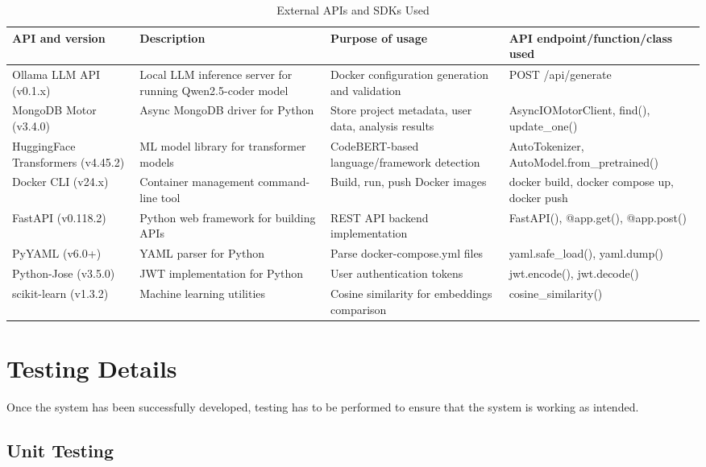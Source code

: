 \begin{table}[H]
\centering
\caption{External APIs and SDKs Used}
\label{tab:apis}
\begin{tabular}{|p{3.5cm}|p{4cm}|p{4cm}|p{4cm}|}
\hline
\textbf{API and version} & \textbf{Description} & \textbf{Purpose of usage} & \textbf{API endpoint/function/class used} \\
\hline
Ollama LLM API (v0.1.x) & Local LLM inference server for running Qwen2.5-coder model & Docker configuration generation and validation & POST /api/generate \\
\hline
MongoDB Motor (v3.4.0) & Async MongoDB driver for Python & Store project metadata, user data, analysis results & AsyncIOMotorClient, find(), update\_one() \\
\hline
HuggingFace Transformers (v4.45.2) & ML model library for transformer models & CodeBERT-based language/framework detection & AutoTokenizer, AutoModel.from\_pretrained() \\
\hline
Docker CLI (v24.x) & Container management command-line tool & Build, run, push Docker images & docker build, docker compose up, docker push \\
\hline
FastAPI (v0.118.2) & Python web framework for building APIs & REST API backend implementation & FastAPI(), @app.get(), @app.post() \\
\hline
PyYAML (v6.0+) & YAML parser for Python & Parse docker-compose.yml files & yaml.safe\_load(), yaml.dump() \\
\hline
Python-Jose (v3.5.0) & JWT implementation for Python & User authentication tokens & jwt.encode(), jwt.decode() \\
\hline
scikit-learn (v1.3.2) & Machine learning utilities & Cosine similarity for embeddings comparison & cosine\_similarity() \\
\hline
\end{tabular}
\end{table}

\section{Testing Details}

Once the system has been successfully developed, testing has to be performed to ensure that the system is working as intended.

\subsection{Unit Testing}

